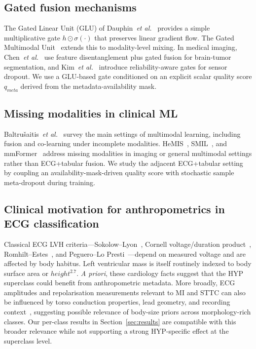 \documentclass[mathematics,article,submit,pdftex]{Definitions/mdpi}
\def\mathrm#1{#1}%
\def\mathbf#1{#1}%
\begin{document}
\subsection{Gated fusion mechanisms}
The Gated Linear Unit (GLU) of Dauphin~\textit{et al.}~\cite{Dauphin2017} provides a simple multiplicative gate $\mathbf{h} \odot \sigma(\cdot)$ that preserves linear gradient flow. The Gated Multimodal Unit~\cite{Arevalo2020} extends this to modality-level mixing. In medical imaging, Chen~\textit{et al.}~\cite{Chen2019MICCAI} use feature disentanglement plus gated fusion for brain-tumor segmentation, and Kim~\textit{et al.}~\cite{Kim2018ACCV} introduce reliability-aware gates for sensor dropout. We use a GLU-based gate conditioned on an explicit scalar quality score $q_{\mathrm{meta}}$ derived from the metadata-availability mask.

\subsection{Missing modalities in clinical ML}
Baltru{\v{s}}aitis~\textit{et al.}~\cite{Baltrusaitis2019} survey the main settings of multimodal learning, including fusion and co-learning under incomplete modalities. HeMIS~\cite{Havaei2016}, SMIL~\cite{Ma2021}, and mmFormer~\cite{Zhang2022} address missing modalities in imaging or general multimodal settings rather than ECG+tabular fusion. We study the adjacent ECG+tabular setting by coupling an availability-mask-driven quality score with stochastic sample meta-dropout during training.

\subsection{Clinical motivation for anthropometrics in ECG classification}
Classical ECG LVH criteria---Sokolow--Lyon~\cite{Sokolow1949}, Cornell voltage/duration product~\cite{Casale1985}, Romhilt--Estes~\cite{Romhilt1968}, and Peguero--Lo Presti~\cite{Peguero2017}---depend on measured voltage and are affected by body habitus. Left ventricular mass is itself routinely indexed to body surface area or $\mathrm{height}^{2.7}$. \emph{A priori}, these cardiology facts suggest that the HYP superclass could benefit from anthropometric metadata. More broadly, ECG amplitudes and repolarisation measurements relevant to MI and STTC can also be influenced by torso conduction properties, lead geometry, and recording context~\cite{Rautaharju2009, MacFarlane2011}, suggesting possible relevance of body-size priors across morphology-rich classes. Our per-class results in Section~\ref{sec:results} are compatible with this broader relevance while not supporting a strong HYP-specific effect at the superclass level.
\end{document}
